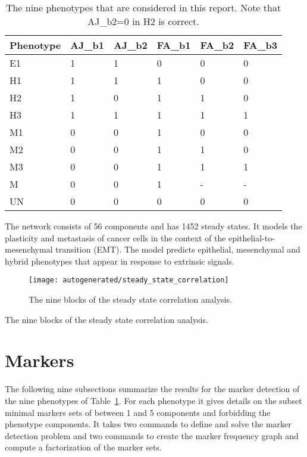 \documentclass[11pt]{article}
\begin{document}
        \begin{table}
            \centering
            \begin{tabular}{llllll}
                \toprule
                Phenotype &  AJ\_b1 & AJ\_b2 & FA\_b1 & FA\_b2 & FA\_b3 \\
                \midrule
                E1 & 1 & 1 & 0 & 0 & 0\\
                H1 & 1 & 1 & 1 & 0 & 0\\
                H2 & 1 & 0 & 1 & 1 & 0\\
                H3 & 1 & 1 & 1 & 1 & 1\\
                M1 & 0 & 0 & 1 & 0 & 0\\
                M2 & 0 & 0 & 1 & 1 & 0\\
                M3 & 0 & 0 & 1 & 1 & 1\\
                M  & 0 & 0 & 1 & - & -\\
                UN & 0 & 0 & 0 & 0 & 0\\
                \bottomrule
            \end{tabular}
            \caption{The nine phenotypes that are considered in this report. Note that AJ\_b2=0 in H2 is correct.}
            \label{tab:phenotypes}
        \end{table}

        The network consists of 56 components and has 1452 steady states.
        It models the plasticity and metastasis of cancer cells in the context of the epithelial-to-mesenchymal transition (EMT).
        The model predicts epithelial, mesenchymal and hybrid phenotypes that appear in response to extrinsic signals.

        \begin{figure}[htp]
            \centering\label{fig:steady-state-correlation}
            \texttt{[image: autogenerated/steady\_state\_correlation]}
            \caption{The nine blocks of the steady state correlation analysis.}
        \end{figure}

        \begin{table}
            \centering\label{tab:correlated-components}
            
            \caption{The nine blocks of the steady state correlation analysis.}
        \end{table}

    \section{Markers}\label{sec:markers}
        The following nine subsections summarize the results for the marker detection of the nine phenotypes of Table~\ref{tab:phenotypes}.
        For each phenotype it gives details on the subset minimal markers sets of between 1 and 5 components and forbidding the phenotype components.
        It takes two commands to define and solve the marker detection problem and two commands to create the marker frequency graph and compute a factorization of the marker sets.
\end{document}

